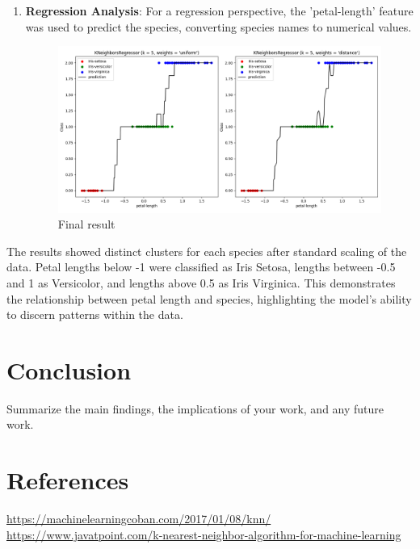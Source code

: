 \documentclass[a4paper]{article}
\begin{document}
\begin{enumerate}
\item \textbf{Regression Analysis}: For a regression perspective, the 'petal-length' feature was used to predict the species, converting species names to numerical values.
	\begin{figure}[h]
		\centering
		\includegraphics[width=1\textwidth]{picture/KNN_Regression_petal}
		\caption{Final result}
		\label{fig:example}
	\end{figure}
\end{enumerate}
 The results showed distinct clusters for each species after standard scaling of the data. Petal lengths below -1 were classified as Iris Setosa, lengths between -0.5 and 1 as Versicolor, and lengths above 0.5 as Iris Virginica. This demonstrates the relationship between petal length and species, highlighting the model's ability to discern patterns within the data.
\newpage
\section{Conclusion}
Summarize the main findings, the implications of your work, and any future work.

\section{References}
\href{https://machinelearningcoban.com/2017/01/08/knn/}{https://machinelearningcoban.com/2017/01/08/knn/}\\
\href{https://www.javatpoint.com/k-nearest-neighbor-algorithm-for-machine-learning}{https://www.javatpoint.com/k-nearest-neighbor-algorithm-for-machine-learning}
\end{document}
